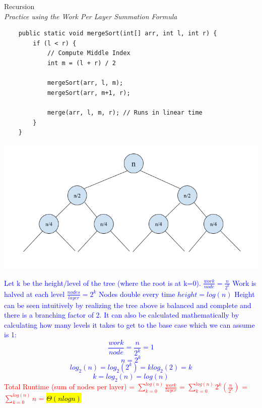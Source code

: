 \documentclass[11pt,letterpaper]{article}
\begin{document}
\problem Recursion
\\
\textit{Practice using the Work Per Layer Summation Formula}
\begin{lstlisting}
    public static void mergeSort(int[] arr, int l, int r) {
        if (l < r) {
            // Compute Middle Index
            int m = (l + r) / 2
            
            mergeSort(arr, l, m);
            mergeSort(arr, m+1, r);
            
            merge(arr, l, m, r); // Runs in linear time 
        }
    }
\end{lstlisting}
\begin{center}
    \includegraphics[scale=0.4]{images/mergeSort.png}    
\end{center}

\textcolor{blue}{
Let k be the height/level of the tree (where the root is at k=0).
\newline
\newline
$\frac{work}{node} = \frac{n}{2^k}$ Work is halved at each level
\newline
\newline
$\frac{nodes}{layer} = 2^k$ Nodes double every time 
\newline
\newline
$height = log(n)$
\newline
Height can be seen intuitively by realizing the tree above is balanced and complete and there is a branching factor of 2. It can also be calculated mathematically by calculating how many levels it takes to get to the base case which we can assume is 1: 
$$\frac{work}{node} = \frac{n}{2^k} = 1$$
$$n = 2^k$$
$$log_2(n) = log_2(2^k) = klog_2(2) = k$$
$$k = log_2(n) = log(n)$$
\newline
}
\textcolor{red}{Total Runtime (sum of nodes per layer) = $\sum_{k=0}^{log(n)}\frac{work}{layer}$ = $\sum_{k=0}^{log(n)} 2^k(\frac{n}{2^k})$ = $\sum_{k=0}^{log(n)} n$ = \hl{$\Theta(nlogn)$}}
\end{document}
